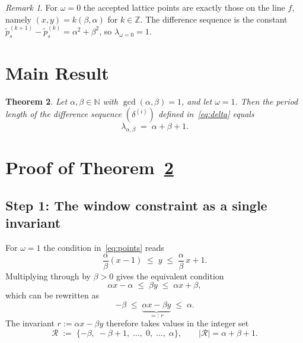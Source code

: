 \documentclass[11pt]{article}
\theoremstyle{plain}
\newtheorem{theorem}{Theorem}[section]
\theoremstyle{definition}
\theoremstyle{remark}
\newtheorem{remark}[theorem]{Remark}
\begin{document}
\begin{remark}
For $\omega = 0$ the accepted lattice points are exactly those on the line $f$,
namely $(x, y) = k(\beta, \alpha)$ for $k \in \mathbb{Z}$.
The difference sequence is the constant $\tilde{p}^{(k+1)}_s - \tilde{p}^{(k)}_s
= \alpha^2 + \beta^2$, so $\lambda_{\omega=0} = 1$.
\end{remark}

\section{Main Result}\label{sec:mainresult}

\begin{theorem}\label{thm:main}
Let $\alpha, \beta \in \mathbb{N}$ with $\gcd(\alpha, \beta) = 1$, and let
$\omega = 1$.  Then the period length of the difference sequence
$(\delta^{(i)})$ defined in~\eqref{eq:delta} equals
\[
    \lambda_{\alpha,\beta} \;=\; \alpha + \beta + 1.
\]
\end{theorem}

\section{Proof of Theorem~\ref{thm:main}}\label{sec:proof}

\subsection{Step 1: The window constraint as a single invariant}
\label{subsec:step1}

For $\omega = 1$ the condition in~\eqref{eq:points} reads
\[
    \frac{\alpha}{\beta}(x - 1) \;\le\; y \;\le\; \frac{\alpha}{\beta}\,x + 1.
\]
Multiplying through by $\beta > 0$ gives the equivalent condition
\[
    \alpha x - \alpha \;\le\; \beta y \;\le\; \alpha x + \beta,
\]
which can be rewritten as
\begin{equation}\label{eq:invariant}
    -\beta \;\le\; \underbrace{\alpha x - \beta y}_{=:\,r} \;\le\; \alpha.
\end{equation}
The invariant $r := \alpha x - \beta y$ therefore takes values in the integer set
\begin{equation}\label{eq:R}
    \mathcal{R} \;:=\; \{-\beta,\; -\beta+1,\; \ldots,\; 0,\; \ldots,\; \alpha\},
    \qquad |\mathcal{R}| = \alpha + \beta + 1.
\end{equation}
\end{document}
